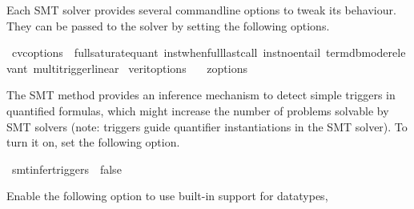 \begin{isabellebody}
\begin{isamarkuptext}%
Each SMT solver provides several commandline options to tweak its
behaviour. They can be passed to the solver by setting the following
options.%
\end{isamarkuptext}\isamarkuptrue%
\isamarkupfalse%
\ {\isacharbrackleft}{\kern0pt}{\isacharbrackleft}{\kern0pt}cvc{}{\isacharunderscore}{\kern0pt}options\ {\isacharequal}{\kern0pt}\ {\isachardoublequoteopen}{\isacharminus}{\kern0pt}{\isacharminus}{\kern0pt}full{\isacharminus}{\kern0pt}saturate{\isacharminus}{\kern0pt}quant\ {\isacharminus}{\kern0pt}{\isacharminus}{\kern0pt}inst{\isacharminus}{\kern0pt}when{\isacharequal}{\kern0pt}full{\isacharminus}{\kern0pt}last{\isacharminus}{\kern0pt}call\ {\isacharminus}{\kern0pt}{\isacharminus}{\kern0pt}inst{\isacharminus}{\kern0pt}no{\isacharminus}{\kern0pt}entail\ {\isacharminus}{\kern0pt}{\isacharminus}{\kern0pt}term{\isacharminus}{\kern0pt}db{\isacharminus}{\kern0pt}mode{\isacharequal}{\kern0pt}relevant\ {\isacharminus}{\kern0pt}{\isacharminus}{\kern0pt}multi{\isacharminus}{\kern0pt}trigger{\isacharminus}{\kern0pt}linear{\isachardoublequoteclose}{\isacharbrackright}{\kern0pt}{\isacharbrackright}{\kern0pt}\isanewline
{}\isamarkupfalse%
\ {\isacharbrackleft}{\kern0pt}{\isacharbrackleft}{\kern0pt}verit{\isacharunderscore}{\kern0pt}options\ {\isacharequal}{\kern0pt}\ {\isachardoublequoteopen}{\isachardoublequoteclose}{\isacharbrackright}{\kern0pt}{\isacharbrackright}{\kern0pt}\isanewline
{}\isamarkupfalse%
\ {\isacharbrackleft}{\kern0pt}{\isacharbrackleft}{\kern0pt}z{}{\isacharunderscore}{\kern0pt}options\ {\isacharequal}{\kern0pt}\ {\isachardoublequoteopen}{\isachardoublequoteclose}{\isacharbrackright}{\kern0pt}{\isacharbrackright}{\kern0pt}%
\begin{isamarkuptext}%
The SMT method provides an inference mechanism to detect simple triggers
in quantified formulas, which might increase the number of problems
solvable by SMT solvers (note: triggers guide quantifier instantiations
in the SMT solver). To turn it on, set the following option.%
\end{isamarkuptext}\isamarkuptrue%
\isamarkupfalse%
\ {\isacharbrackleft}{\kern0pt}{\isacharbrackleft}{\kern0pt}smt{\isacharunderscore}{\kern0pt}infer{\isacharunderscore}{\kern0pt}triggers\ {\isacharequal}{\kern0pt}\ false{\isacharbrackright}{\kern0pt}{\isacharbrackright}{\kern0pt}%
\begin{isamarkuptext}%
Enable the following option to use built-in support for datatypes,

\end{isamarkuptext}
\end{isabellebody}
